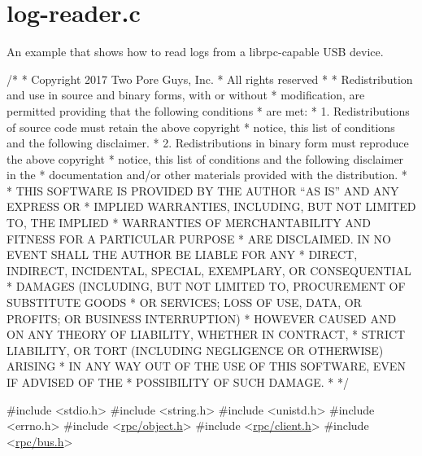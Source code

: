 \hypertarget{log-reader_8c-example}{}\section{log-\/reader.\+c}
An example that shows how to read logs from a librpc-\/capable U\+SB device.


\begin{DoxyCodeInclude}
\textcolor{comment}{/*}
\textcolor{comment}{ * Copyright 2017 Two Pore Guys, Inc.}
\textcolor{comment}{ * All rights reserved}
\textcolor{comment}{ *}
\textcolor{comment}{ * Redistribution and use in source and binary forms, with or without}
\textcolor{comment}{ * modification, are permitted providing that the following conditions}
\textcolor{comment}{ * are met:}
\textcolor{comment}{ * 1. Redistributions of source code must retain the above copyright}
\textcolor{comment}{ *    notice, this list of conditions and the following disclaimer.}
\textcolor{comment}{ * 2. Redistributions in binary form must reproduce the above copyright}
\textcolor{comment}{ *    notice, this list of conditions and the following disclaimer in the}
\textcolor{comment}{ *    documentation and/or other materials provided with the distribution.}
\textcolor{comment}{ *}
\textcolor{comment}{ * THIS SOFTWARE IS PROVIDED BY THE AUTHOR ``AS IS'' AND ANY EXPRESS OR}
\textcolor{comment}{ * IMPLIED WARRANTIES, INCLUDING, BUT NOT LIMITED TO, THE IMPLIED}
\textcolor{comment}{ * WARRANTIES OF MERCHANTABILITY AND FITNESS FOR A PARTICULAR PURPOSE}
\textcolor{comment}{ * ARE DISCLAIMED.  IN NO EVENT SHALL THE AUTHOR BE LIABLE FOR ANY}
\textcolor{comment}{ * DIRECT, INDIRECT, INCIDENTAL, SPECIAL, EXEMPLARY, OR CONSEQUENTIAL}
\textcolor{comment}{ * DAMAGES (INCLUDING, BUT NOT LIMITED TO, PROCUREMENT OF SUBSTITUTE GOODS}
\textcolor{comment}{ * OR SERVICES; LOSS OF USE, DATA, OR PROFITS; OR BUSINESS INTERRUPTION)}
\textcolor{comment}{ * HOWEVER CAUSED AND ON ANY THEORY OF LIABILITY, WHETHER IN CONTRACT,}
\textcolor{comment}{ * STRICT LIABILITY, OR TORT (INCLUDING NEGLIGENCE OR OTHERWISE) ARISING}
\textcolor{comment}{ * IN ANY WAY OUT OF THE USE OF THIS SOFTWARE, EVEN IF ADVISED OF THE}
\textcolor{comment}{ * POSSIBILITY OF SUCH DAMAGE.}
\textcolor{comment}{ *}
\textcolor{comment}{ */}

\textcolor{preprocessor}{#include <stdio.h>}
\textcolor{preprocessor}{#include <string.h>}
\textcolor{preprocessor}{#include <unistd.h>}
\textcolor{preprocessor}{#include <errno.h>}
\textcolor{preprocessor}{#include <\hyperlink{object_8h}{rpc/object.h}>}
\textcolor{preprocessor}{#include <\hyperlink{client_8h}{rpc/client.h}>}
\textcolor{preprocessor}{#include <\hyperlink{bus_8h}{rpc/bus.h}>}


\end{DoxyCodeInclude}
